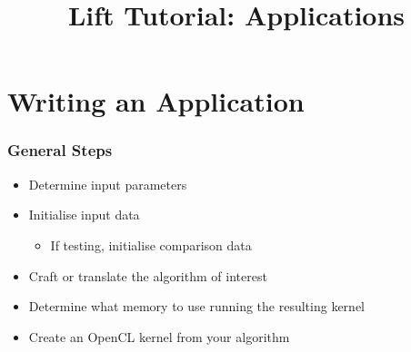 \documentclass[10pt]{beamer}
\title{Lift Tutorial: Applications}
\date{}
\begin{document}
\begin{frame}
\maketitle
\end{frame}


\section{Writing an Application}

\begin{frame}
\frametitle{General Steps}
\begin{itemize}
    \item Determine input parameters 
    \item Initialise input data 
            \begin{itemize}
                \item If testing, initialise comparison data 
            \end{itemize}
    \item Craft or translate the algorithm of interest 
    \item Determine what memory to use running the resulting kernel 
    \item Create an OpenCL kernel from your algorithm 
\end{itemize}
\end{frame}
\end{document}
